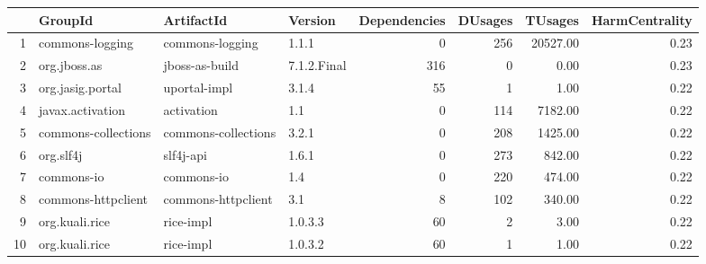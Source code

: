 \begin{table}[ht]
\centering
\begin{tabular}{rlllrrrr}
  \hline
 & GroupId & ArtifactId & Version & Dependencies & DUsages & TUsages & HarmCentrality \\ 
  \hline
1 & commons-logging & commons-logging & 1.1.1 &   0 & 256 & 20527.00 & 0.23 \\ 
  2 & org.jboss.as & jboss-as-build & 7.1.2.Final & 316 &   0 & 0.00 & 0.23 \\ 
  3 & org.jasig.portal & uportal-impl & 3.1.4 &  55 &   1 & 1.00 & 0.22 \\ 
  4 & javax.activation & activation & 1.1 &   0 & 114 & 7182.00 & 0.22 \\ 
  5 & commons-collections & commons-collections & 3.2.1 &   0 & 208 & 1425.00 & 0.22 \\ 
  6 & org.slf4j & slf4j-api & 1.6.1 &   0 & 273 & 842.00 & 0.22 \\ 
  7 & commons-io & commons-io & 1.4 &   0 & 220 & 474.00 & 0.22 \\ 
  8 & commons-httpclient & commons-httpclient & 3.1 &   8 & 102 & 340.00 & 0.22 \\ 
  9 & org.kuali.rice & rice-impl & 1.0.3.3 &  60 &   2 & 3.00 & 0.22 \\ 
  10 & org.kuali.rice & rice-impl & 1.0.3.2 &  60 &   1 & 1.00 & 0.22 \\ 
   \hline
\end{tabular}
\end{table}
